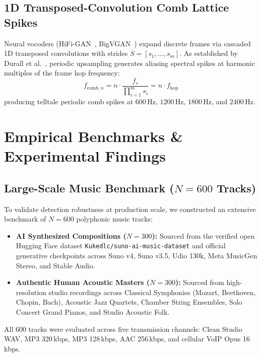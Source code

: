 \documentclass[conference]{IEEEtran}
\theoremstyle{definition}
\begin{document}
\subsection{1D Transposed-Convolution Comb Lattice Spikes}
Neural vocoders (HiFi-GAN~\cite{kong2020hifi}, BigVGAN~\cite{lee2022bigvgan}) expand discrete frames via cascaded 1D transposed convolutions with strides $S = [s_1, \dots, s_m]$. As established by Durall et al.~\cite{durall2020watch}, periodic upsampling generates aliasing spectral spikes at harmonic multiples of the frame hop frequency:
\begin{equation}
f_{\text{comb}, n} = n \cdot \frac{f_s}{\prod_{i=1}^m s_i} = n \cdot f_{\text{hop}}
\end{equation}
producing telltale periodic comb spikes at $600$\,Hz, $1200$\,Hz, $1800$\,Hz, and $2400$\,Hz.

\section{Empirical Benchmarks \& Experimental Findings}

\subsection{Large-Scale Music Benchmark ($N=600$ Tracks)}
To validate detection robustness at production scale, we constructed an extensive benchmark of $N=600$ polyphonic music tracks:
\begin{itemize}
    \item \textbf{AI Synthesized Compositions ($N=300$):} Sourced from the verified open Hugging Face dataset \texttt{Kukedlc/suno-ai-music-dataset} and official generative checkpoints across Suno v4, Suno v3.5, Udio 130k, Meta MusicGen Stereo, and Stable Audio.
    \item \textbf{Authentic Human Acoustic Masters ($N=300$):} Sourced from high-resolution studio recordings across Classical Symphonies (Mozart, Beethoven, Chopin, Bach), Acoustic Jazz Quartets, Chamber String Ensembles, Solo Concert Grand Pianos, and Studio Acoustic Folk.
\end{itemize}

All $600$ tracks were evaluated across five transmission channels: Clean Studio WAV, MP3 320\,kbps, MP3 128\,kbps, AAC 256\,kbps, and cellular VoIP Opus 16\,kbps.
\end{document}
